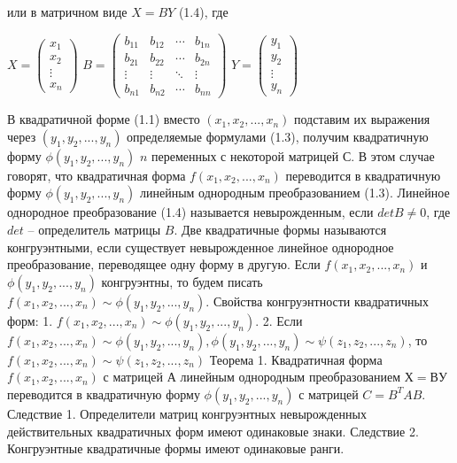 \documentclass[a4paper,14pt]{report}
\newcommand\tab[1][1cm]{\hspace*{#1}}
\newcommand{\tl}{\newline\tab}
\begin{document}
или в матричном виде $X=BY$ (1.4), где  \newline
\begin{center}
$X = \begin{pmatrix}
x_{1}  \\
x_{2} \\        
\vdots \\
x_{n}
\end{pmatrix}$
$B = \begin{pmatrix}
b_{11} & b_{12} & \cdots & b_{1n} \\
b_{21} & b_{22} & \cdots & b_{2n} \\        
\vdots & \vdots & \ddots & \vdots \\
b_{n1} & b_{n2} & \cdots & b_{nn}
\end{pmatrix}$
$Y = \begin{pmatrix}
y_{1}  \\
y_{2} \\        
\vdots \\
y_{n}
\end{pmatrix}$
\end{center}
\tab
В квадратичной форме (1.1) вместо $(x_1, x_2,...,x_n)$ подставим их выражения через $(y_1, y_2,...,y_n)$ определяемые формулами (1.3), получим квадратичную форму $\phi (y_1, y_2,...,y_n)$ $n$ переменных с некоторой матрицей $С$. В этом случае говорят, что квадратичная форма $f(x_1, x_2,...,x_n)$ переводится в квадратичную форму $\phi(y_1, y_2,...,y_n)$ линейным однородным преобразованием (1.3). Линейное однородное преобразование (1.4) называется невырожденным, если $det B \ne 0$, где $det$ – определитель матрицы $B$.
\tl
Две квадратичные формы называются конгруэнтными, если существует невырожденное линейное однородное преобразование, переводящее одну форму в другую. Если $f(x_1, x_2,...,x_n)$ и $\phi(y_1, y_2,...,y_n)$ конгруэнтны, то будем писать $f(x_1, x_2,...,x_n) \sim \phi(y_1, y_2,...,y_n)$. Свойства конгруэнтности квадратичных форм:
\tl
1.  $f(x_1, x_2,...,x_n) \sim \phi(y_1, y_2,...,y_n)$.
\tl
2. Если $f(x_1, x_2,...,x_n) \sim \phi(y_1, y_2,...,y_n), \phi(y_1, y_2,...,y_n) \sim \psi(z_1,z_2,...,z_n)$, то $f(x_1, x_2,...,x_n) \sim \psi(z_1,z_2,...,z_n)$
\tl
Теорема 1. Квадратичная форма $f(x_1, x_2,...,x_n)$ с матрицей $А$ линейным однородным преобразованием $Х = ВУ$ переводится в квадратичную форму $\phi(y_1, y_2,...,y_n)$ с матрицей $C=B^{T}AB$.
\tl
Следствие 1. Определители матриц конгруэнтных невырожденных действительных квадратичных форм имеют одинаковые знаки.
\tl
Следствие 2. Конгруэнтные квадратичные формы имеют одинаковые ранги.
\end{document}

